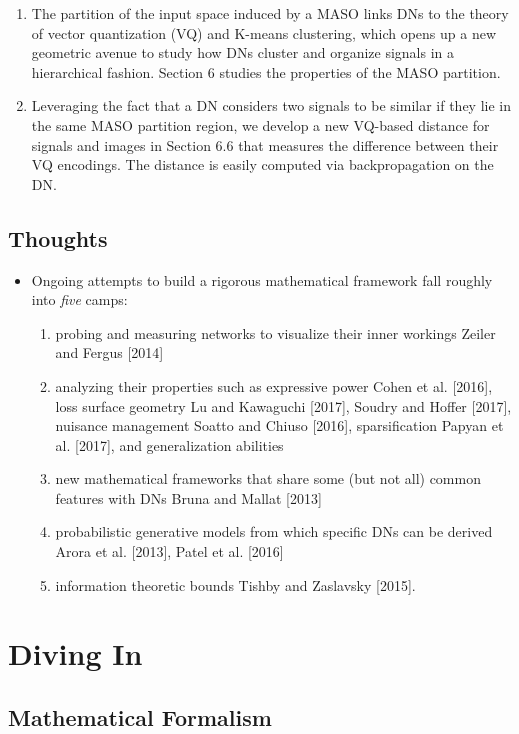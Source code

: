 \documentclass{article}
\begin{document}
\begin{enumerate}
	\item The partition of the input space induced by a MASO links DNs to the theory of vector quantization (VQ) and K-means clustering, which opens up a new geometric avenue to study how DNs cluster and organize signals in a hierarchical fashion. Section 6 studies the properties of the MASO partition.
	\item Leveraging the fact that a DN considers two signals to be similar if they lie in the same MASO partition region, we develop a new VQ-based distance for signals and images in Section 6.6 that measures the difference between their VQ encodings. The distance is easily computed via backpropagation on the DN.
\end{enumerate}


\subsection{Thoughts}

\begin{itemize}
	\item Ongoing attempts to build a rigorous mathematical framework fall roughly into \emph{five} camps:
	\begin{enumerate}
		\item probing and measuring networks to visualize their inner workings Zeiler and Fergus [2014]
		\item analyzing their properties such as expressive power Cohen et al. [2016], loss surface geometry Lu and Kawaguchi [2017], Soudry and Hoffer [2017], nuisance management Soatto and Chiuso [2016], sparsification Papyan et al. [2017], and generalization abilities
		\item new mathematical frameworks that share some (but not all) common features with DNs Bruna and Mallat [2013]
		\item probabilistic generative models from which specific DNs can be derived Arora et al. [2013], Patel et al. [2016]
		\item information theoretic bounds Tishby and Zaslavsky [2015].
	\end{enumerate}
\end{itemize}


 

\section{Diving In}


\subsection{Mathematical  Formalism}
\end{document}
